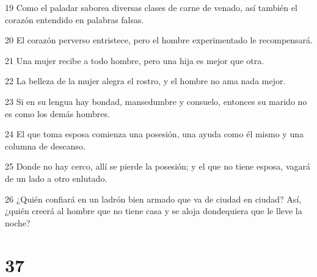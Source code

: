 \par 19 Como el paladar saborea diversas clases de carne de venado, así también el corazón entendido en palabras falsas.
\par 20 El corazón perverso entristece, pero el hombre experimentado le recompensará.
\par 21 Una mujer recibe a todo hombre, pero una hija es mejor que otra.
\par 22 La belleza de la mujer alegra el rostro, y el hombre no ama nada mejor.
\par 23 Si en su lengua hay bondad, mansedumbre y consuelo, entonces su marido no es como los demás hombres.
\par 24 El que toma esposa comienza una posesión, una ayuda como él mismo y una columna de descanso.
\par 25 Donde no hay cerco, allí se pierde la posesión; y el que no tiene esposa, vagará de un lado a otro enlutado.
\par 26 ¿Quién confiará en un ladrón bien armado que va de ciudad en ciudad? Así, ¿quién creerá al hombre que no tiene casa y se aloja dondequiera que le lleve la noche?

\chapter{37}

